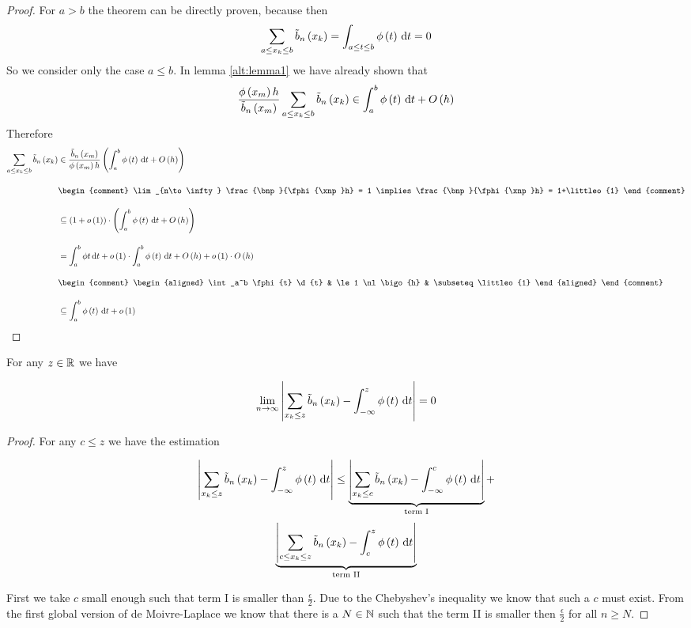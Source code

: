 \begin{proof}
  For $a > b$ the theorem can be directly proven, because then
  \begin{align}
    \sum_{a \le x_{k} \le b} \tilde b_{n}\left({x_{k}}\right) = \int_{a \le t \le b} \phi\left( {t} \right) \,\mathrm d{t} = 0
  \end{align}
  So we consider only the case $a\le b$. In lemma \ref{alt:lemma1} we have already shown that
  \begin{align}
    \frac{\phi\left( {x_{m}} \right)h}{\tilde b_{n}\left({x_{m}}\right)} \sum_{a\le x_{k} \le b} \tilde b_{n}\left({x_{k}}\right) \in \int_a^b \phi\left( {t} \right) \,\mathrm d{t} + O\left( {h} \right)
  \end{align}
  Therefore
  \begin{align}
    \sum_{a\le \x \le b} \bb{\x} & \in \frac{\bnp}{\fphi{\xnp}h} \br{\int_a^b \fphi{t} \d{t} + \bigo{h}} \bnl
    &
    \begin{comment}
      \lim_{n\to\infty} \frac{\bnp}{\fphi{\xnp}h} = 1 \implies \frac{\bnp}{\fphi{\xnp}h} = 1+\littleo{1}
    \end{comment} \bnl
    & \subseteq \br{1+\littleo{1}}\cdot \br{\int_a^b \fphi{t} \d{t} + \bigo{h}} \bnl
    & = \int_a^b \phi{t}\d{t} + \littleo{1} \cdot \int_a^b \fphi{t} \d{t} + \bigo{h} + \littleo{1} \cdot \bigo{h} \bnl
    &
    \begin{comment}
      \begin{aligned}
        \int_a^b \fphi{t} \d{t} & \le 1 \nl
        \bigo{h} & \subseteq \littleo{1}
      \end{aligned}
    \end{comment} \bnl
    & \subseteq \int_a^b \fphi{t} \d{t} + \littleo{1}
  \end{align}
\end{proof}

\begin{theorem}
  For any $z\in\mathbb R$ we have

  \begin{align}
    \lim_{n\to\infty} \left|{\sum_{x_{k} \le z} \tilde b_{n}\left({x_{k}}\right) - \int_{-\infty}^z \phi\left( {t} \right)\,\mathrm d{t} }\right| = 0
  \end{align}
\end{theorem}

\begin{proof}
  For any $c \le z$ we have the estimation

  \begin{multline}
    \abs{\sum_{\x \le z} \bb{\x} - \int_{-\infty}^z \fphi{t}\d{t} } \le
    \underbrace{\abs{\sum_{\x \le c} \bb{\x} - \int_{-\infty}^c \fphi{t}\d{t} }}_\text{term I} + \nl \underbrace{\abs{\sum_{c\le \x \le z} \bb{\x} - \int_c^z \fphi{t}\d{t} }}_\text{term II}
  \end{multline}

  First we take $c$ small enough such that term I is smaller than $\frac \epsilon 2$. Due to the Chebyshev's inequality \cite{wiki:chebyshev} we know that such a $c$ must exist. From the first global version of de Moivre-Laplace we know that there is a $N \in\mathbb N$ such that the term II is smaller then $\frac \epsilon 2$ for all $n\ge N$.
\end{proof}
